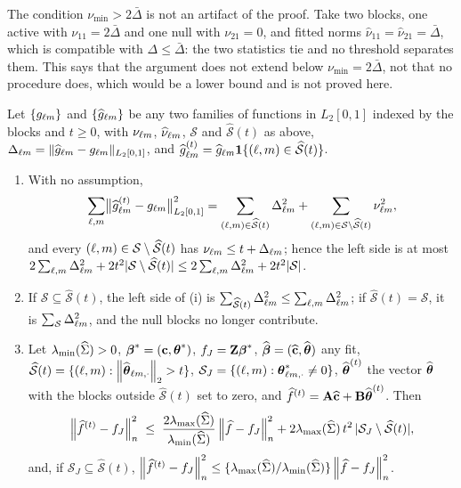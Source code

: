 \begin{remark}
\label{rem:window}
The condition $\nu_{\min} > 2\bar{\Delta}$ is not an artifact of the proof. Take two blocks,
one active with $\nu_{11} = 2\bar{\Delta}$ and one null with $\nu_{21} = 0$, and fitted
norms $\widehat{\nu}_{11} = \widehat{\nu}_{21} = \bar{\Delta}$, which is compatible with
$\Delta \le \bar{\Delta}$: the two statistics tie and no threshold separates them. This
says that the argument does not extend below $\nu_{\min} = 2\bar{\Delta}$, not that no
procedure does, which would be a lower bound and is not proved here.
\end{remark}

\begin{lemma}
\label{lem:thrisk}
Let $\{g_{\ell m}\}$ and $\{\widehat{g}_{\ell m}\}$ be any two families of
functions in $L_2[0,1]$ indexed by the blocks and $t \ge 0$, with
$\nu_{\ell m}$, $\widehat{\nu}_{\ell m}$, $\mathcal{S}$ and
$\widehat{\mathcal{S}}(t)$ as above, $\Delta_{\ell m} = \lVert\widehat{g}_{\ell m} -
g_{\ell m}\rVert_{L_2[0,1]}$, and
$\widehat{g}^{(t)}_{\ell m} = \widehat{g}_{\ell m}
\mathbf{1}\{(\ell,m)\in\widehat{\mathcal{S}}(t)\}$.
\begin{enumerate}
\item[(i)] With no assumption,
\[
  \sum_{\ell,m}\bigl\lVert\widehat{g}^{(t)}_{\ell m}-g_{\ell m}
  \bigr\rVert_{L_2[0,1]}^{2}
  = \sum_{(\ell,m)\in\widehat{\mathcal{S}}(t)}\Delta_{\ell m}^{2}
  + \sum_{(\ell,m)\in\mathcal{S}\setminus\widehat{\mathcal{S}}(t)}\nu_{\ell m}^{2},
\]
and every $(\ell,m) \in \mathcal{S}\setminus\widehat{\mathcal{S}}(t)$ has
$\nu_{\ell m} \le t + \Delta_{\ell m}$; hence the left side is at most
$2\sum_{\ell,m}\Delta_{\ell m}^{2} + 2t^{2}|\mathcal{S}\setminus\widehat{\mathcal{S}}(t)|
\le 2\sum_{\ell,m}\Delta_{\ell m}^{2} + 2t^{2}|\mathcal{S}|$.
\item[(ii)] If $\mathcal{S} \subseteq \widehat{\mathcal{S}}(t)$, the left side
of (i) is $\sum_{\widehat{\mathcal{S}}(t)}\Delta_{\ell m}^{2} \le \sum_{\ell,m}\Delta_{\ell m}^{2}$;
if $\widehat{\mathcal{S}}(t) = \mathcal{S}$, it is $\sum_{\mathcal{S}}\Delta_{\ell m}^{2}$,
and the null blocks no longer contribute.
\item[(iii)] Let $\lambda_{\min}(\widehat{\Sigma}) > 0$, $\boldsymbol{\beta}^{*} = (\mathbf{c},\boldsymbol{\theta}^{*})$,
$f_J = \mathbf{Z}\boldsymbol{\beta}^{*}$, $\widehat{\boldsymbol{\beta}} = (\widehat{\mathbf{c}},\widehat{\boldsymbol{\theta}})$ any fit,
$\widehat{\mathcal{S}}(t) = \{(\ell,m) : \left\lVert \widehat{\boldsymbol{\theta}}_{\ell m,\cdot} \right\rVert_{2} > t\}$,
$\mathcal{S}_J = \{(\ell,m) : \boldsymbol{\theta}^{*}_{\ell m,\cdot} \ne 0\}$,
$\widehat{\boldsymbol{\theta}}^{(t)}$ the vector $\widehat{\boldsymbol{\theta}}$ with the blocks outside
$\widehat{\mathcal{S}}(t)$ set to zero, and
$\widehat{f}^{(t)} = \mathbf{A}\widehat{\mathbf{c}} + \mathbf{B}\widehat{\boldsymbol{\theta}}^{(t)}$. Then
\[
  \left\lVert \widehat{f}^{(t)}-f_J \right\rVert_{n}^{2} \;\le\;
  \frac{2\lambda_{\max}(\widehat{\Sigma})}{\lambda_{\min}(\widehat{\Sigma})}\left\lVert \widehat{f}-f_J \right\rVert_{n}^{2}
  + 2\lambda_{\max}(\widehat{\Sigma})\,t^{2}\,|\mathcal{S}_J\setminus\widehat{\mathcal{S}}(t)|,
\]
and, if $\mathcal{S}_J \subseteq \widehat{\mathcal{S}}(t)$,
$\left\lVert \widehat{f}^{(t)}-f_J \right\rVert_{n}^{2} \le
\{\lambda_{\max}(\widehat{\Sigma})/\lambda_{\min}(\widehat{\Sigma})\}\left\lVert \widehat{f}-f_J \right\rVert_{n}^{2}$.
\end{enumerate}
\end{lemma}

